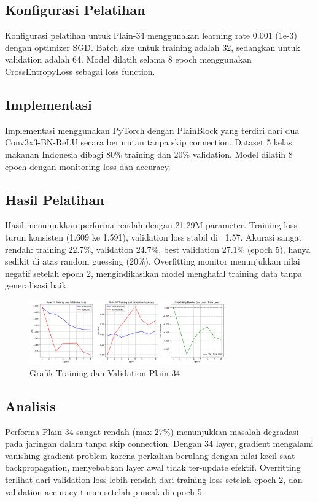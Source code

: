 \documentclass[11pt,a4paper]{article}
\begin{document}
\subsection{Konfigurasi Pelatihan}
Konfigurasi pelatihan untuk Plain-34 menggunakan learning rate 0.001 (1e-3) dengan optimizer SGD. Batch size untuk training adalah 32, sedangkan untuk validation adalah 64. Model dilatih selama 8 epoch menggunakan CrossEntropyLoss sebagai loss function.

\subsection{Implementasi}
Implementasi menggunakan PyTorch dengan PlainBlock yang terdiri dari dua Conv3x3-BN-ReLU secara berurutan tanpa skip connection. Dataset 5 kelas makanan Indonesia dibagi 80\% training dan 20\% validation. Model dilatih 8 epoch dengan monitoring loss dan accuracy.

\subsection{Hasil Pelatihan}
Hasil menunjukkan performa rendah dengan 21.29M parameter. Training loss turun konsisten (1.609 ke 1.591), validation loss stabil di ~1.57. Akurasi sangat rendah: training 22.7\%, validation 24.7\%, best validation 27.1\% (epoch 5), hanya sedikit di atas random guessing (20\%). Overfitting monitor menunjukkan nilai negatif setelah epoch 2, mengindikasikan model menghafal training data tanpa generalisasi baik.
\begin{figure}[h]
\centering
\includegraphics[width=0.75\textwidth]{Figure/plainnet34.png}
\caption{Grafik Training dan Validation Plain-34}
\label{fig:plain34}
\end{figure}

\subsection{Analisis}
Performa Plain-34 sangat rendah (max 27\%) menunjukkan masalah degradasi pada jaringan dalam tanpa skip connection. 
Dengan 34 layer, gradient mengalami vanishing gradient problem karena perkalian berulang dengan nilai kecil saat backpropagation, 
menyebabkan layer awal tidak ter-update efektif. Overfitting terlihat dari validation loss lebih rendah dari training loss setelah epoch 2, 
dan validation accuracy turun setelah puncak di epoch 5.
\end{document}
